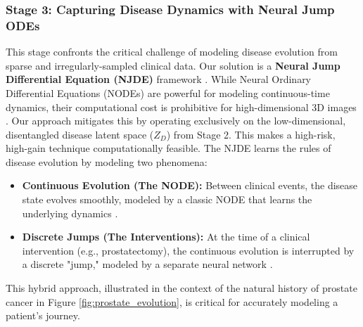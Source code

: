 \documentclass[11pt, a4paper]{article}
\begin{document}
\subsubsection{Stage 3: Capturing Disease Dynamics with Neural Jump ODEs}
This stage confronts the critical challenge of modeling disease evolution from sparse and irregularly-sampled clinical data. Our solution is a \textbf{Neural Jump Differential Equation (NJDE)} framework \cite{GwakSim2020}. While Neural Ordinary Differential Equations (NODEs) are powerful for modeling continuous-time dynamics, their computational cost is prohibitive for high-dimensional 3D images \cite{WiewelBecher2018, DavisChoromanski2020}. Our approach mitigates this by operating exclusively on the low-dimensional, disentangled disease latent space ($Z_D$) from Stage 2. This makes a high-risk, high-gain technique computationally feasible. The NJDE learns the rules of disease evolution by modeling two phenomena:
\begin{itemize}
    \item \textbf{Continuous Evolution (The NODE):} Between clinical events, the disease state evolves smoothly, modeled by a classic NODE that learns the underlying dynamics \cite{BergHasenclever2018}.
    \item \textbf{Discrete Jumps (The Interventions):} At the time of a clinical intervention (e.g., prostatectomy), the continuous evolution is interrupted by a discrete "jump," modeled by a separate neural network \cite{CuchieroLarsson2019, AbushaqraXue2022}.
\end{itemize}
This hybrid approach, illustrated in the context of the natural history of prostate cancer in Figure \ref{fig:prostate_evolution}, is critical for accurately modeling a patient's journey.
\end{document}
